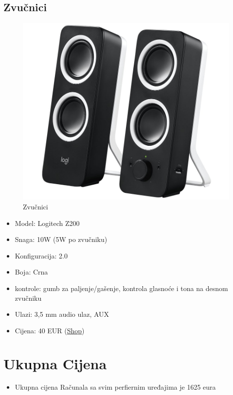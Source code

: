 \documentclass{article}
\begin{document}
\subsection{Zvučnici}
\begin{figure}[H]
    \centering
    \includegraphics[width = \textwidth]{Slike/zvucnici.jpg}
    \caption{Zvučnici}
    \label{fig:Zvučnici}
\end{figure}
\begin{itemize}
    \item Model: Logitech Z200
    \item Snaga: 10W (5W po zvučniku)
    \item Konfiguracija: 2.0
    \item Boja: Crna
    \item kontrole: gumb za paljenje/gašenje, kontrola glasnoće i tona na desnom zvučniku
    \item Ulazi: 3,5 mm audio ulaz, AUX
    \item Cijena: 40 EUR (\href{https://www.instar-informatika.hr/zvucnici-logitech-z200-10w-20-crni/8412/product/?utm_source=nabava.net&utm_campaign=nabava.net&utm_medium=click}{Shop})
\end{itemize}

\section{Ukupna Cijena}
\begin{itemize}
    \item Ukupna cijena Računala sa svim perfiernim uređajima je 1625 eura
\end{itemize}
\end{document}
